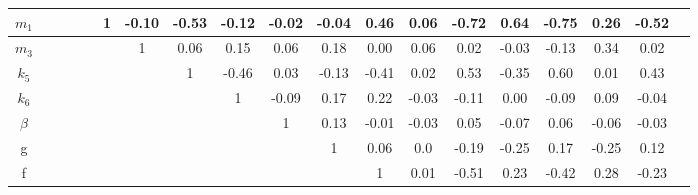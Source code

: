 \begin{table}[p]
{\begin{minipage}{24.4cm}
\begin{tabular}{|c|c|c|c|c|c|c|c|c|c|c|c|c|c|c|c|c|c|c|}
\cellcolor{dark-gray}$m_1$ & \cellcolor{light-gray} & \cellcolor{light-gray} & \cellcolor{light-gray} & \cellcolor{light-gray} & \cellcolor{light-gray}1 & -0.10 & \cellcolor{orange}-0.53 & -0.12 & -0.02 & -0.04 & \cellcolor{orange}0.46 & 0.06 & \cellcolor{orange}-0.72 & \cellcolor{orange}0.64 & \cellcolor{orange}-0.75 & 0.26 & \cellcolor{orange}-0.52\\ \hline
\cellcolor{dark-gray}$m_3$ & \cellcolor{light-gray} & \cellcolor{light-gray} & \cellcolor{light-gray} & \cellcolor{light-gray} & \cellcolor{light-gray} & \cellcolor{light-gray}1 & 0.06 & 0.15 & 0.06 & 0.18 & 0.00 & 0.06 & 0.02 & -0.03 & -0.13 & \cellcolor{orange}0.34 & 0.02\\ \hline
\cellcolor{dark-gray}$k_5$ & \cellcolor{light-gray} & \cellcolor{light-gray} & \cellcolor{light-gray} & \cellcolor{light-gray} & \cellcolor{light-gray} & \cellcolor{light-gray} & \cellcolor{light-gray}1 & \cellcolor{orange}-0.46 & 0.03 & -0.13 & \cellcolor{orange}-0.41 & 0.02 & \cellcolor{orange}0.53 & \cellcolor{orange}-0.35 & \cellcolor{orange}0.60 & 0.01 & \cellcolor{orange}0.43\\ \hline
\cellcolor{dark-gray}$k_6$ & \cellcolor{light-gray} & \cellcolor{light-gray} & \cellcolor{light-gray} & \cellcolor{light-gray} & \cellcolor{light-gray} & \cellcolor{light-gray} & \cellcolor{light-gray} & \cellcolor{light-gray}1 & -0.09 & 0.17 & 0.22 & -0.03 & -0.11 & 0.00 & -0.09 & 0.09 & -0.04\\ \hline
\cellcolor{dark-gray}$\beta$ & \cellcolor{light-gray} & \cellcolor{light-gray} & \cellcolor{light-gray} & \cellcolor{light-gray} & \cellcolor{light-gray} & \cellcolor{light-gray} & \cellcolor{light-gray} & \cellcolor{light-gray} & \cellcolor{light-gray}1 & 0.13 & -0.01 & -0.03 & 0.05 & -0.07 & 0.06 & -0.06 & -0.03\\ \hline
\cellcolor{dark-gray}g & \cellcolor{light-gray} & \cellcolor{light-gray} & \cellcolor{light-gray} & \cellcolor{light-gray} & \cellcolor{light-gray} & \cellcolor{light-gray} & \cellcolor{light-gray} & \cellcolor{light-gray} & \cellcolor{light-gray} & \cellcolor{light-gray}1 & 0.06 & 0.0 & -0.19 & -0.25 & 0.17 & -0.25 & 0.12\\ \hline
\cellcolor{dark-gray}f & \cellcolor{light-gray} & \cellcolor{light-gray} & \cellcolor{light-gray} & \cellcolor{light-gray} & \cellcolor{light-gray} & \cellcolor{light-gray} & \cellcolor{light-gray} & \cellcolor{light-gray} & \cellcolor{light-gray} & \cellcolor{light-gray} & \cellcolor{light-gray}1 & 0.01 & \cellcolor{orange}-0.51 & 0.23 & \cellcolor{orange}-0.42 & 0.28 & -0.23\\ \hline

\end{tabular}
\end{minipage}}
\end{table}
